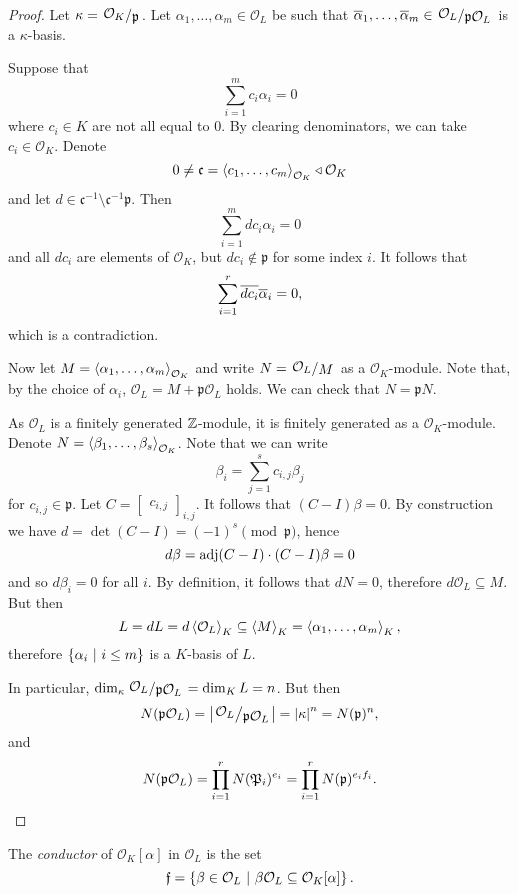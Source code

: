 \begin{proof}
Let $\kappa = \kvoc{\mathcal{O}_K}{\mathfrak{p}}$. Let
$\alpha_1, \dots, \alpha_m \in \mathcal{O}_L$ be such that
$\oline{\alpha}_1, \dots, \oline{\alpha}_m \in
\kvoc{\mathcal{O}_L}{\mathfrak{p} \mathcal{O}_L}$ is a
$\kappa$-basis.

Suppose that
\[
\sum_{i=1}^m c_i \alpha_i = 0
\]
where $c_i \in K$ are not all equal to $0$. By clearing
denominators, we can take $c_i \in \mathcal{O}_K$. Denote
\[
0 \ne \mathfrak{c} =
\left\langle c_1, \dots, c_m\right\rangle_{\mathcal{O}_K} \triangleleft \mathcal{O}_K
\]
and let
$d \in \mathfrak{c}^{-1} \setminus \mathfrak{c}^{-1} \mathfrak{p}$.
Then
\[
\sum_{i=1}^m d c_i \alpha_i = 0
\]
and all $d c_i$ are elements of $\mathcal{O}_K$, but
$d c_i \not \in \mathfrak{p}$ for some index $i$. It follows that
\[
\sum_{i=1}^r \overline{d c_i} \overline{\alpha}_i = 0,
\]
which is a contradiction.

Now let $M = \left\langle \alpha_1, \dots, \alpha_m\right\rangle_{\mathcal{O}_K}$ and
write $N = \kvoc{\mathcal{O}_L}{M}$ as a $\mathcal{O}_K$-module.
Note that, by the choice of $\alpha_i$,
$\mathcal{O}_L = M + \mathfrak{p} \mathcal{O}_L$ holds. We can
check that $N = \mathfrak{p} N$.

As $\mathcal{O}_L$ is a finitely generated $\mathbb{Z}$-module, it is
finitely generated as a $\mathcal{O}_K$-module. Denote
$N = \left\langle \beta_1, \dots, \beta_s\right\rangle_{\mathcal{O}_K}$. Note that we
can write
\[
\beta_i = \sum_{j=1}^s c_{i,j} \beta_j
\]
for $c_{i,j} \in \mathfrak{p}$. Let
$C = \begin{bmatrix} c_{i,j} \end{bmatrix}_{i,j}$. It follows that
$(C-I) \beta = 0$. By construction we have
$d = \det(C-I) = (-1)^s \pmod{\mathfrak{p}}$, hence
\[
d \beta = \operatorname{adj}(C-I) \cdot (C-I) \beta = 0
\]
and so $d \beta_i = 0$ for all $i$. By definition, it follows
that $dN = 0$, therefore $d \mathcal{O}_L \subseteq M$. But then
\[
L =
dL =
d \left\langle \mathcal{O}_L\right\rangle_K \subseteq
\left\langle M\right\rangle_K =
\left\langle \alpha_1, \dots, \alpha_m\right\rangle_K,
\]
therefore $\left\{\alpha_i~\middle\vert~i \leq m\right\}$ is a $K$-basis of $L$.

In particular,
$\dim_\kappa \kvoc{\mathcal{O}_L}{\mathfrak{p}\mathcal{O}_L} =
\dim_K L = n$. But then
\[
N(\mathfrak{p} \mathcal{O}_L) =
\abs{\kvoc{\mathcal{O}_L}{\mathfrak{p} \mathcal{O}_L}} =
\abs{\kappa}^n =
N(\mathfrak{p})^n,
\]
and
\[
N(\mathfrak{p} \mathcal{O}_L) =
\prod_{i=1}^r N(\mathfrak{P}_i)^{e_i} =
\prod_{i=1}^r N(\mathfrak{p})^{e_i f_i}. \qedhere
\]
\end{proof}

\begin{definicija}
The \emph{conductor} of $\mathcal{O}_K[\alpha]$ in
$\mathcal{O}_L$ is the set
\[
\mathfrak{f} =
\left\{\beta \in \mathcal{O}_L~\middle\vert~\beta \mathcal{O}_L \subseteq \mathcal{O}_K[\alpha]\right\}.
\]
\end{definicija}

